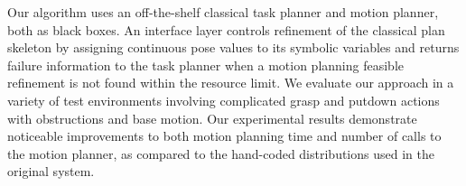 Our algorithm uses an off-the-shelf classical task planner and motion planner, both as black
boxes. An interface layer controls refinement of the classical plan skeleton by assigning continuous pose
values to its symbolic variables and returns failure information to the task planner
when a motion planning feasible refinement is not found within the resource limit. We evaluate
our approach in a variety of test environments involving complicated grasp and putdown
actions with obstructions and base motion. Our experimental results demonstrate noticeable
improvements to both motion planning time and number of calls to the motion planner, as compared
to the hand-coded distributions used in the original system.